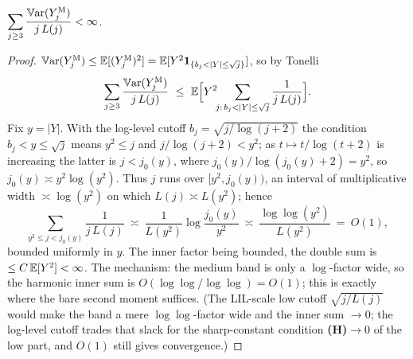 \begin{lemma}\label{lem:hw_medium_var}
\leanok
{}
$\displaystyle\sum_{j\ge3}\frac{\mathbb{V}\mathrm{ar}(Y_j^{\mathrm M})}{j\,L(j)}<\infty$.
\end{lemma}
\begin{proof}
$\Var(Y_j^{\mathrm M})\le\E[(Y_j^{\mathrm M})^2]=\E[Y^2\indic_{\{b_j<|Y|\le\sqrt j\}}]$,
so by Tonelli
\[
  \sum_{j\ge3}\frac{\Var(Y_j^{\mathrm M})}{j\,L(j)}\ \le\
  \E\Big[Y^2\!\!\sum_{j:\,b_j<|Y|\le\sqrt j}\frac{1}{j\,L(j)}\Big].
\]
Fix $y=|Y|$. With the log-level cutoff $b_j=\sqrt{j/\log(j+2)}$ the condition
$b_j<y\le\sqrt j$ means $y^2\le j$ and $j/\log(j+2)<y^2$; as $t\mapsto t/\log(t+2)$ is
increasing the latter is $j<j_0(y)$, where $j_0(y)/\log(j_0(y)+2)=y^2$, so
$j_0(y)\asymp y^2\log(y^2)$. Thus $j$ runs over $[y^2,j_0(y))$, an interval of
multiplicative width $\asymp\log(y^2)$ on which $L(j)\asymp L(y^2)$; hence
\[
  \sum_{y^2\le j<j_0(y)}\frac{1}{j\,L(j)}\ \asymp\
  \frac{1}{L(y^2)}\log\frac{j_0(y)}{y^2}\ \asymp\
  \frac{\log\log(y^2)}{L(y^2)}\ =\ O(1),
\]
bounded uniformly in $y$. The inner factor being bounded, the double sum is
$\le C\,\mathbb{E}[Y^2]<\infty$. The mechanism: the medium band is only a $\log$-factor wide, so
the harmonic inner sum is $O(\log\log/\log\log)=O(1)$; this is exactly where the bare
second moment suffices. (The LIL-scale low cutoff $\sqrt{j/L(j)}$ would make the band a
mere $\log\log$-factor wide and the inner sum $\to0$; the log-level cutoff trades that
slack for the sharp-constant condition \textbf{(H)}$\to0$ of the low part, and $O(1)$
still gives convergence.)


\end{proof}
